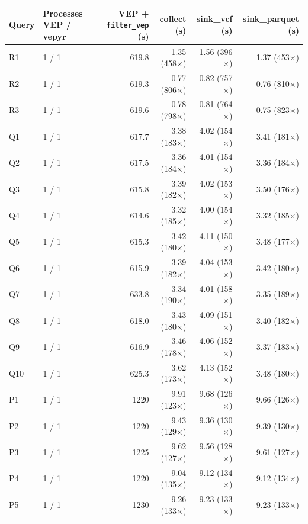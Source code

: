 \begin{tabular}{llrrrr}
\toprule
Query & Processes VEP / vepyr & VEP + \texttt{filter\_vep} (s) & collect (s) & sink\_vcf (s) & sink\_parquet (s) \\
\midrule
R1 & 1 / 1 & 619.8 & 1.35 (458$\times$) & 1.56 (396$\times$) & 1.37 (453$\times$) \\
R2 & 1 / 1 & 619.3 & 0.77 (806$\times$) & 0.82 (757$\times$) & 0.76 (810$\times$) \\
R3 & 1 / 1 & 619.6 & 0.78 (798$\times$) & 0.81 (764$\times$) & 0.75 (823$\times$) \\
Q1 & 1 / 1 & 617.7 & 3.38 (183$\times$) & 4.02 (154$\times$) & 3.41 (181$\times$) \\
Q2 & 1 / 1 & 617.5 & 3.36 (184$\times$) & 4.01 (154$\times$) & 3.36 (184$\times$) \\
Q3 & 1 / 1 & 615.8 & 3.39 (182$\times$) & 4.02 (153$\times$) & 3.50 (176$\times$) \\
Q4 & 1 / 1 & 614.6 & 3.32 (185$\times$) & 4.00 (154$\times$) & 3.32 (185$\times$) \\
Q5 & 1 / 1 & 615.3 & 3.42 (180$\times$) & 4.11 (150$\times$) & 3.48 (177$\times$) \\
Q6 & 1 / 1 & 615.9 & 3.39 (182$\times$) & 4.04 (153$\times$) & 3.42 (180$\times$) \\
Q7 & 1 / 1 & 633.8 & 3.34 (190$\times$) & 4.01 (158$\times$) & 3.35 (189$\times$) \\
Q8 & 1 / 1 & 618.0 & 3.43 (180$\times$) & 4.09 (151$\times$) & 3.40 (182$\times$) \\
Q9 & 1 / 1 & 616.9 & 3.46 (178$\times$) & 4.06 (152$\times$) & 3.37 (183$\times$) \\
Q10 & 1 / 1 & 625.3 & 3.62 (173$\times$) & 4.13 (152$\times$) & 3.48 (180$\times$) \\
P1 & 1 / 1 & 1220 & 9.91 (123$\times$) & 9.68 (126$\times$) & 9.66 (126$\times$) \\
P2 & 1 / 1 & 1220 & 9.43 (129$\times$) & 9.36 (130$\times$) & 9.39 (130$\times$) \\
P3 & 1 / 1 & 1225 & 9.62 (127$\times$) & 9.56 (128$\times$) & 9.61 (127$\times$) \\
P4 & 1 / 1 & 1220 & 9.04 (135$\times$) & 9.12 (134$\times$) & 9.12 (134$\times$) \\
P5 & 1 / 1 & 1230 & 9.26 (133$\times$) & 9.23 (133$\times$) & 9.23 (133$\times$) \\
\bottomrule
\end{tabular}
